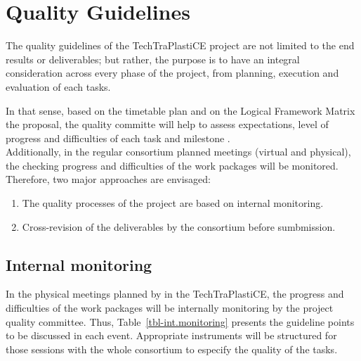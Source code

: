 \documentclass[
  12pt,
  oneside]{book}
\providecommand{\tightlist}{%
  \setlength{\itemsep}{0pt}\setlength{\parskip}{0pt}}\usepackage{longtable,booktabs,array}
\begin{document}
\section{Quality Guidelines}\label{quality-guidelines}

The quality guidelines of the TechTraPlastiCE project are not limited to
the end results or deliverables; but rather, the purpose is to have an
integral consideration across every phase of the project, from planning,
execution and evaluation of each tasks.

In that sense, based on the timetable plan and on the Logical Framework
Matrix the proposal, the quality committe will help to assess
expectations, level of progress and difficulties of each task and
milestone .\\
Additionally, in the regular consortium planned meetings (virtual and
physical), the checking progress and difficulties of the work packages
will be monitored. Therefore, two major approaches are envisaged:

\begin{enumerate}
\def\labelenumi{\arabic{enumi}.}
\tightlist
\item
  The quality processes of the project are based on internal monitoring.
\item
  Cross-revision of the deliverables by the consortium before
  sumbmission.
\end{enumerate}

\subsection{Internal monitoring}\label{internal-monitoring}

In the physical meetings planned by in the TechTraPlastiCE, the progress
and difficulties of the work packages will be internally monitoring by
the project quality committee. Thus, Table~\ref{tbl-int.monitoring}
presents the guideline points to be discussed in each event. Appropriate
instruments will be structured for those sessions with the whole
consortium to especify the quality of the tasks.
\end{document}
